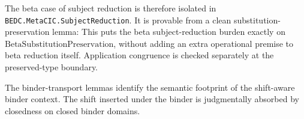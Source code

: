 The beta case of subject reduction is therefore isolated in
\texttt{BEDC.MetaCIC.SubjectReduction}. It is provable from a clean
substitution-preservation lemma:
This puts the beta subject-reduction burden exactly on
$\mathrm{BetaSubstitutionPreservation}$, without adding an extra
operational premise to beta reduction itself. Application congruence is
checked separately at the preserved-type boundary.

The binder-transport lemmas identify the semantic footprint of the shift-aware
binder context. The shift inserted under the binder is judgmentally absorbed by
closedness on closed binder domains.














